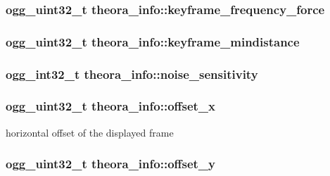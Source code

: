 \subsubsection[{keyframe\+\_\+frequency\+\_\+force}]{\setlength{\rightskip}{0pt plus 5cm}ogg\+\_\+uint32\+\_\+t theora\+\_\+info\+::keyframe\+\_\+frequency\+\_\+force}\label{structtheora__info_ad9d2e22c44a53473010e6d1042dfe0d8}
\subsubsection[{keyframe\+\_\+mindistance}]{\setlength{\rightskip}{0pt plus 5cm}ogg\+\_\+uint32\+\_\+t theora\+\_\+info\+::keyframe\+\_\+mindistance}\label{structtheora__info_aa79ca8c0e77a884d4487fd627fae32e9}
\subsubsection[{noise\+\_\+sensitivity}]{\setlength{\rightskip}{0pt plus 5cm}ogg\+\_\+int32\+\_\+t theora\+\_\+info\+::noise\+\_\+sensitivity}\label{structtheora__info_ac4789034f547b57d1075e035050eeed9}
\subsubsection[{offset\+\_\+x}]{\setlength{\rightskip}{0pt plus 5cm}ogg\+\_\+uint32\+\_\+t theora\+\_\+info\+::offset\+\_\+x}\label{structtheora__info_af5949a02bef29512f2705e6f6c944e3b}


horizontal offset of the displayed frame 

\subsubsection[{offset\+\_\+y}]{\setlength{\rightskip}{0pt plus 5cm}ogg\+\_\+uint32\+\_\+t theora\+\_\+info\+::offset\+\_\+y}\label{structtheora__info_a91c3922097ba32a85acd584a01dc2c93}


